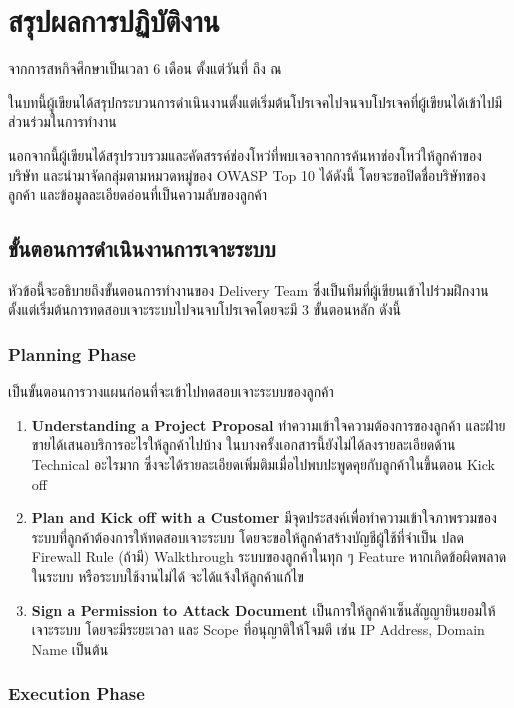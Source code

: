 \chapter{สรุปผลการปฏิบัติงาน}
\label{chapter:experiment}

จากการสหกิจศึกษาเป็นเวลา 6 เดือน ตั้งแต่วันที่ \StartDWork ถึง \EndDWork ณ \Company

ในบทนี้ผู้เขียนได้สรุปกระบวนการดำเนินงานตั้งแต่เริ่มต้นโปรเจคไปจนจบโปรเจคที่ผู้เขียนได้เข้าไปมีส่วนร่วมในการทำงาน

นอกจากนี้ผู้เขียนได้สรุปรวบรวมและคัดสรรค์ช่องโหว่ที่พบเจอจากการค้นหาช่องโหว่ให้ลูกค้าของบริษัท และนำมาจัดกลุ่มตามหมวดหมู่ของ OWASP Top 10 ได้ดังนี้ โดยจะขอปิดชื่อบริษัทของลูกค้า และข้อมูลละเอียดอ่อนที่เป็นความลับของลูกค้า

\section{ขั้นตอนการดำเนินงานการเจาะระบบ}

หัวข้อนี้จะอธิบายถึงขั้นตอนการทำงานของ Delivery Team ซึ่งเป็นทีมที่ผู้เขียนเข้าไปร่วมฝึกงานตั้งแต่เริ่มต้นการทดสอบเจาะระบบไปจนจบโปรเจคโดยจะมี 3 ขั้นตอนหลัก ดังนี้

\subsection{Planning Phase}

เป็นขั้นตอนการวางแผนก่อนที่จะเข้าไปทดสอบเจาะระบบของลูกค้า

\begin{enumerate}
	\item \textbf{Understanding a Project Proposal} ทำความเข้าใจความต้องการของลูกค้า และฝ่ายขายได้เสนอบริการอะไรให้ลูกค้าไปบ้าง ในบางครั้งเอกสารนี้ยังไม่ได้ลงรายละเอียดด้าน Technical อะไรมาก ซึ่งจะได้รายละเอียดเพิ่มติมเมื่อไปพบปะพูดคุยกับลูกค้าในขึ้นตอน Kick off
	\item \textbf{Plan and Kick off with a Customer} มีจุดประสงค์เพื่อทำความเข้าใจภาพรวมของระบบที่ลูกค้าต้องการให้ทดสอบเจาะระบบ โดยจะขอให้ลูกค้าสร้างบัญชีผู้ใช้ที่จำเป็น ปลด Firewall Rule (ถ้ามี) Walkthrough ระบบของลูกค้าในทุก ๆ Feature หากเกิดข้อผิดพลาดในระบบ หรือระบบใช้งานไม่ได้ จะได้แจ้งให้ลูกค้าแก้ไข
	\item \textbf{Sign a Permission  to Attack Document} เป็นการให้ลูกค้าเซ็นสัญญายินยอมให้เจาะระบบ โดยจะมีระยะเวลา และ Scope ที่อนุญาติให้โจมตี เช่น IP Address, Domain Name เป็นต้น
\end{enumerate}

\subsection{Execution Phase}

